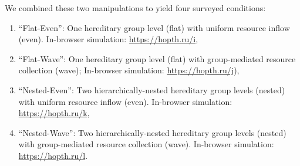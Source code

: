 We combined these two manipulations to yield four surveyed conditions:
\begin{enumerate}
\item ``Flat-Even'': One hereditary group level (flat) with uniform resource inflow (even). In-browser simulation: \url{https://hopth.ru/i},
\item ``Flat-Wave'': One  hereditary group level (flat) with group-mediated resource collection (wave); In-browser simulation: \url{https://hopth.ru/j}),
\item ``Nested-Even'': Two hierarchically-nested hereditary group levels (nested) with uniform resource inflow (even). In-browser simulation: \url{https://hopth.ru/k},
\item ``Nested-Wave'': Two hierarchically-nested hereditary group levels (nested) with group-mediated resource collection (wave). In-browser simulation: \url{https://hopth.ru/l}.
\end{enumerate}
